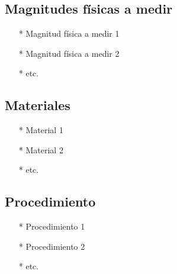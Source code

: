 \subsection{Magnitudes físicas a medir}

\begin{itemize}
    \item[*] Magnitud física a medir 1
    \item[*] Magnitud física a medir 2
    \item[*] etc.
\end{itemize}

\subsection{Materiales}

\begin{itemize}
    \item[*] Material 1
    \item[*] Material 2
    \item[*] etc.
\end{itemize}

\subsection{Procedimiento}

\begin{enumerate}
    \item[*] Procedimiento 1
    \item[*] Procedimiento 2
    \item[*] etc.
\end{enumerate}